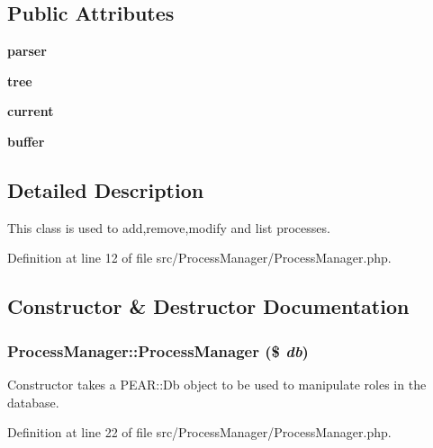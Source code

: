 \subsection*{Public Attributes}
\begin{CompactItemize}
\item 
{}
{\bf parser}\label{classProcessManager_m0}

\item 
{}
{\bf tree}\label{classProcessManager_m1}

\item 
{}
{\bf current}\label{classProcessManager_m2}

\item 
{}
{\bf buffer}\label{classProcessManager_m3}

\end{CompactItemize}


\subsection{Detailed Description}
This class is used to add,remove,modify and list processes. 



Definition at line 12 of file src/Process\-Manager/Process\-Manager.php.

\subsection{Constructor \& Destructor Documentation}
\subsubsection{\setlength{\rightskip}{0pt plus 5cm}Process\-Manager::Process\-Manager (\$ {\em db})}\label{classProcessManager_a0}


Constructor takes a PEAR::Db object to be used to manipulate roles in the database. 

Definition at line 22 of file src/Process\-Manager/Process\-Manager.php.

